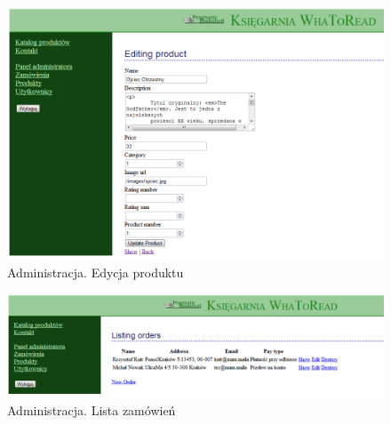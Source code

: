 \documentclass[pdflatex,11pt]{aghdpl}
\begin{document}
\clearpage


\begin{figure}[!h]
\centering
\includegraphics[width=\textwidth]{admin_edycja_produktu}
\caption{Administracja. Edycja produktu}
\label{fig:admin_edycja_produktu}
\end{figure}


\begin{figure}[!h]
\centering
\includegraphics[width=\textwidth]{admin_zamowienia}
\caption{Administracja. Lista zamówień}
\label{fig:admin_zamowienia}
\end{figure}
\end{document}
